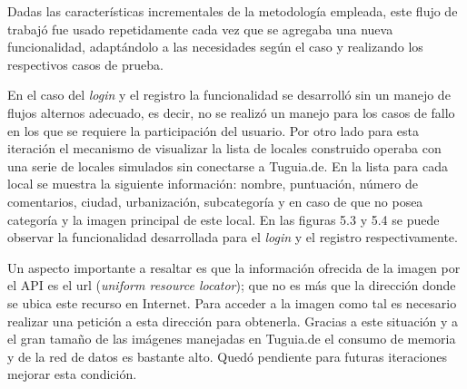 Dadas las características incrementales de la metodología empleada, este flujo de trabajó fue usado repetidamente cada vez que se agregaba una nueva funcionalidad, adaptándolo a las necesidades según el caso y realizando los respectivos casos de prueba.

En el caso del \textit{login} y el registro la funcionalidad se desarrolló sin un manejo de flujos alternos adecuado, es decir, no se realizó un manejo para los casos de fallo en los que se requiere la participación del usuario. Por otro lado para esta iteración el mecanismo de visualizar la lista de locales construido operaba con una serie de locales simulados sin conectarse a Tuguia.de. En la lista para cada local se muestra la siguiente información: nombre, puntuación, número de comentarios, ciudad, urbanización, subcategoría y en caso de que no posea categoría y la imagen principal de este local. En las figuras 5.3 y 5.4 se puede observar la funcionalidad desarrollada para el \textit{login} y el registro respectivamente.

Un aspecto importante a resaltar es que la información ofrecida de la imagen por el API es el url (\textit{uniform resource locator}); que no es más que la dirección donde se ubica este recurso en Internet. Para acceder a la imagen como tal es necesario realizar una petición a esta dirección para obtenerla. Gracias a este situación y a el gran tamaño de las imágenes manejadas en Tuguia.de el consumo de memoria y de la red de datos es bastante alto. Quedó pendiente para futuras iteraciones mejorar esta condición.
 
